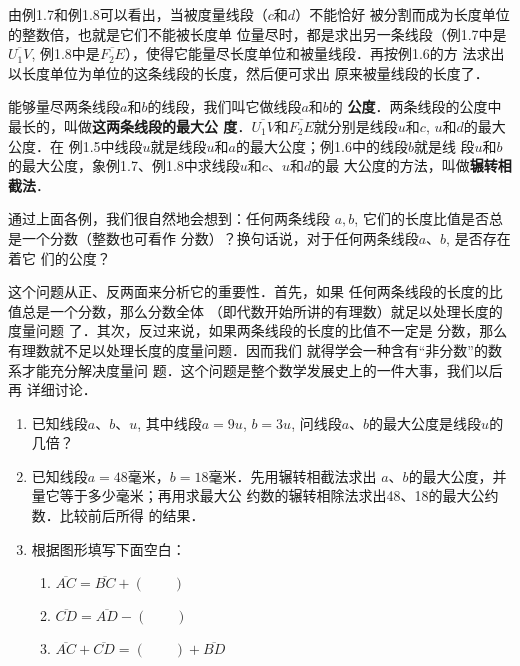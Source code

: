 由例1.7和例1.8可以看出，当被度量线段（$c$和$d$）不能恰好
被分割而成为长度单位的整数倍，也就是它们不能被长度单
位量尽时，都是求出另一条线段（例1.7中是$\overline{U_1V}$, 例1.8中是$\overline{F_2E}$），使得它能量尽长度单位和被量线段．再按例1.6的方
法求出以长度单位为单位的这条线段的长度，然后便可求出
原来被量线段的长度了．

能够量尽两条线段$a$和$b$的线段，我们叫它做线段$a$和$b$的
\textbf{公度}．两条线段的公度中最长的，叫做\textbf{这两条线段的最大公
度}．$\overline{U_1V}$和$\overline{F_2E}$就分别是线段$u$和$c$, $u$和$d$的最大公度．在
例1.5中线段$u$就是线段$u$和$a$的最大公度；例1.6中的线段$b$就是线
段$u$和$b$的最大公度，象例1.7、例1.8中求线段$u$和$c$、$u$和$d$的最
大公度的方法，叫做\textbf{辗转相截法}．

通过上面各例，我们很自然地会想到：任何两条线段
$a, b$, 它们的长度比值是否总是一个分数（整数也可看作
分数）？换句话说，对于任何两条线段$a$、$b$, 是否存在着它
们的公度？

这个问题从正、反两面来分析它的重要性．首先，如果
任何两条线段的长度的比值总是一个分数，那么分数全体
（即代数开始所讲的有理数）就足以处理长度的度量问题
了．其次，反过来说，如果两条线段的长度的比值不一定是
分数，那么有理数就不足以处理长度的度量问题．因而我们
就得学会一种含有“非分数”的数系才能充分解决度量问
题．这个问题是整个数学发展史上的一件大事，我们以后再
详细讨论．

\begin{ex}
\begin{enumerate}
	\item 已知线段$a$、$b$、$u$, 其中线段$a=9u$, $b=3u$, 问线段$a$、$b$的最大公度是线段$u$的几倍？
	\item 已知线段$a=48$毫米，$b=18$毫米．先用辗转相截法求出
	$a$、$b$的最大公度，并量它等于多少毫米；再用求最大公
	约数的辗转相除法求出48、18的最大公约数．比较前后所得
	的结果．
	\item 根据图形填写下面空白：
\begin{enumerate}
	\item $\overline{AC}=\overline{BC}+(\qquad)$	
	\item	$\overline{CD}=\overline{AD}-(\qquad)$	
	\item $\overline{AC}+\overline{CD}=(\qquad)+\overline{BD}$
\end{enumerate}
\begin{center}
\end{center}
\end{enumerate}
\end{ex}

